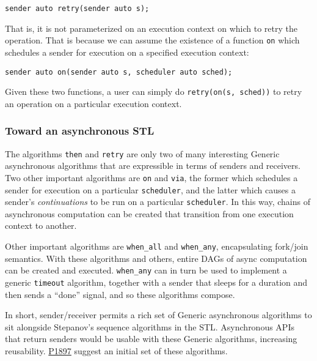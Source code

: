\documentclass[a4paper,12pt,notitlepage,twoside,openright]{article}
\begin{document}
\begin{verbatim}
sender auto retry(sender auto s);
\end{verbatim}

That is, it is not parameterized on an execution context on which to
retry the operation. That is because we can assume the existence of a
function \texttt{on} which schedules a sender for execution
on a specified execution context:

\begin{verbatim}
sender auto on(sender auto s, scheduler auto sched);
\end{verbatim}

Given these two functions, a user can simply do
\texttt{retry(on(s, sched))} to retry an operation on a
particular execution context.

\hypertarget{toward-an-asynchronous-stl}{%
\subsubsection{Toward an asynchronous
STL}\label{toward-an-asynchronous-stl}}

The algorithms \texttt{then} and \texttt{retry}
are only two of many interesting Generic asynchronous algorithms that
are expressible in terms of senders and receivers. Two other important
algorithms are \texttt{on} and \texttt{via}, the
former which schedules a sender for execution on a particular
\texttt{scheduler}, and the latter which causes a sender's
\emph{continuations} to be run on a particular
\texttt{scheduler}. In this way, chains of asynchronous
computation can be created that transition from one execution context to
another.

Other important algorithms are \texttt{when_all} and
\texttt{when_any}, encapsulating fork/join semantics. With
these algorithms and others, entire DAGs of async computation can be
created and executed. \texttt{when_any} can in turn be used
to implement a generic \texttt{timeout} algorithm, together
with a sender that sleeps for a duration and then sends a ``done''
signal, and so these algorithms compose.

In short, sender/receiver permits a rich set of Generic asynchronous
algorithms to sit alongside Stepanov's sequence algorithms in the STL.
Asynchronous APIs that return senders would be usable with these Generic
algorithms, increasing reusability. \href{http://wg21.link/P1897}{P1897}
suggest an initial set of these algorithms.
\end{document}
